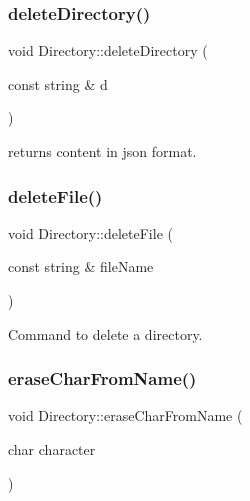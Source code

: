 \mbox{\label{class_directory_a8d233286b4964b8261543fa823e66f9e}} 
\subsubsection{\texorpdfstring{delete\+Directory()}{deleteDirectory()}}
{\footnotesize\ttfamily void Directory\+::delete\+Directory (\begin{DoxyParamCaption}\item[{const string \&}]{d }\end{DoxyParamCaption})}



returns content in json format. 

\mbox{\label{class_directory_ac5d2847c135eff94ce4fedd8099de18a}} 
\subsubsection{\texorpdfstring{delete\+File()}{deleteFile()}}
{\footnotesize\ttfamily void Directory\+::delete\+File (\begin{DoxyParamCaption}\item[{const string \&}]{file\+Name }\end{DoxyParamCaption})}



Command to delete a directory. 

\mbox{\label{class_directory_ad8718bf810510f06e1932a8083ae09e2}} 
\subsubsection{\texorpdfstring{erase\+Char\+From\+Name()}{eraseCharFromName()}}
{\footnotesize\ttfamily void Directory\+::erase\+Char\+From\+Name (\begin{DoxyParamCaption}\item[{char}]{character }\end{DoxyParamCaption})\hspace{0.3cm}{\ttfamily [inline]}}



